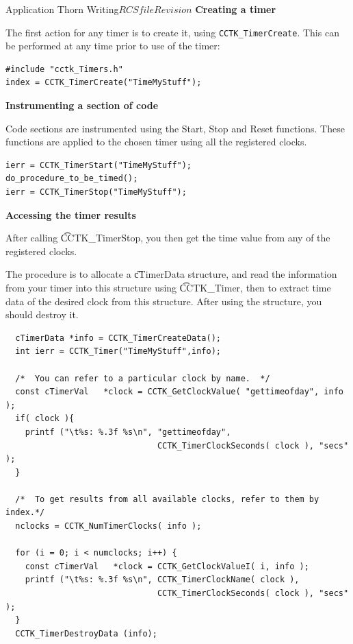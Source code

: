 \begin{cactuspart}{Application Thorn Writing}{$RCSfile$}{$Revision$}
{\bf Creating a timer}

The first action for any timer is to create it, using
\texttt{CCTK\_TimerCreate}. 
This can be performed at any time prior to use of the timer:

\begin{verbatim}
#include "cctk_Timers.h"
index = CCTK_TimerCreate("TimeMyStuff");
\end{verbatim}

{\bf Instrumenting a section of code}

Code sections are instrumented using the Start, Stop and Reset functions. These
functions are applied to the chosen timer using all the registered clocks.
\begin{verbatim}
ierr = CCTK_TimerStart("TimeMyStuff");
do_procedure_to_be_timed();
ierr = CCTK_TimerStop("TimeMyStuff");
\end{verbatim}

{\bf Accessing the timer results}

After calling {\t CCTK\_TimerStop}, you then get the time value from
any of the registered clocks.

The procedure is to allocate a {\t cTimerData} structure,
and read the information from your timer into this structure
using {\t CCTK\_Timer}, then to extract time data of the desired clock from
this structure.  After using the structure, you should destroy it.

\begin{verbatim}
  cTimerData *info = CCTK_TimerCreateData();
  int ierr = CCTK_Timer("TimeMyStuff",info);

  /*  You can refer to a particular clock by name.  */
  const cTimerVal   *clock = CCTK_GetClockValue( "gettimeofday", info );
  if( clock ){
    printf ("\t%s: %.3f %s\n", "gettimeofday",
                               CCTK_TimerClockSeconds( clock ), "secs" );
  }

  /*  To get results from all available clocks, refer to them by index.*/
  nclocks = CCTK_NumTimerClocks( info );

  for (i = 0; i < numclocks; i++) {
    const cTimerVal   *clock = CCTK_GetClockValueI( i, info );
    printf ("\t%s: %.3f %s\n", CCTK_TimerClockName( clock ),
                               CCTK_TimerClockSeconds( clock ), "secs" );
  }
  CCTK_TimerDestroyData (info);
\end{verbatim}



\end{cactuspart}
